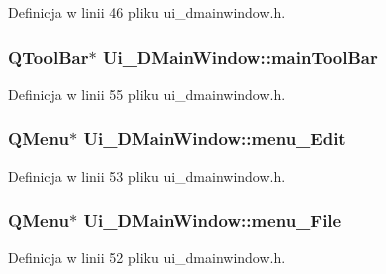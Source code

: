 Definicja w linii 46 pliku ui\+\_\+dmainwindow.\+h.

\hypertarget{class_ui___d_main_window_a2e1da3781ee1e5913b25b85f4c29b97f}{}
\subsubsection[{main\+Tool\+Bar}]{\setlength{\rightskip}{0pt plus 5cm}Q\+Tool\+Bar$\ast$ Ui\+\_\+\+D\+Main\+Window\+::main\+Tool\+Bar}\label{class_ui___d_main_window_a2e1da3781ee1e5913b25b85f4c29b97f}


Definicja w linii 55 pliku ui\+\_\+dmainwindow.\+h.

\hypertarget{class_ui___d_main_window_a8826a3e34a5aa75fca2b8e45b7010a8b}{}
\subsubsection[{menu\+\_\+\+Edit}]{\setlength{\rightskip}{0pt plus 5cm}Q\+Menu$\ast$ Ui\+\_\+\+D\+Main\+Window\+::menu\+\_\+\+Edit}\label{class_ui___d_main_window_a8826a3e34a5aa75fca2b8e45b7010a8b}


Definicja w linii 53 pliku ui\+\_\+dmainwindow.\+h.

\hypertarget{class_ui___d_main_window_a991f4d15852faf04d8c12694b3e077ad}{}
\subsubsection[{menu\+\_\+\+File}]{\setlength{\rightskip}{0pt plus 5cm}Q\+Menu$\ast$ Ui\+\_\+\+D\+Main\+Window\+::menu\+\_\+\+File}\label{class_ui___d_main_window_a991f4d15852faf04d8c12694b3e077ad}


Definicja w linii 52 pliku ui\+\_\+dmainwindow.\+h.

\hypertarget{class_ui___d_main_window_ac2997077098614d72b21d29c7a48350c}{}
